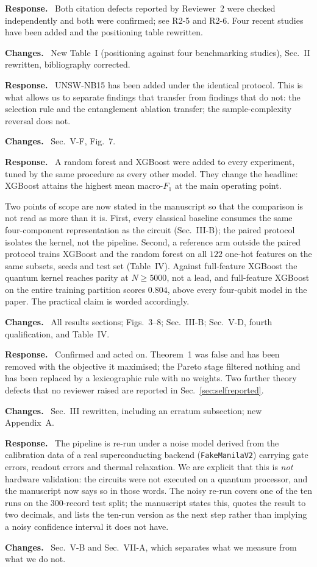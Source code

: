 \documentclass[11pt,a4paper]{article}
\newcommand{\itemhead}[2]{%
  \par\addvspace{15pt}%
  \noindent{\bfseries\color{tagink}#1}\hspace{0.7em}{\bfseries #2}%
  \par\addvspace{3.5pt}%
  \noindent{\color{rulegray}\rule{\linewidth}{0.5pt}}%
  \par\addvspace{5pt}%
  \nobreak}
\newcommand{\resp}{\par\addvspace{2pt}\noindent\textbf{Response.}\ }
\newcommand{\changed}{\par\addvspace{5pt}\noindent
  {\bfseries\color{tagink}Changes.}\ }
\begin{document}
\itemhead{AE-2}{Insufficient literature coverage, including non-existent
references}
\resp
Both citation defects reported by Reviewer~2 were checked independently and both
were confirmed; see R2-5 and R2-6. Four recent studies have been added and the
positioning table rewritten.
\changed
New Table~I (positioning against four benchmarking studies), Sec.~II rewritten,
bibliography corrected.

\itemhead{AE-3}{Reviewer~1 requests validation on an additional dataset}
\resp
UNSW-NB15 has been added under the identical protocol. This is what allows us to
separate findings that transfer from findings that do not: the selection rule
and the entanglement ablation transfer; the sample-complexity reversal does not.
\changed
Sec.~V-F, Fig.~7.

\itemhead{AE-4}{Comparison with non-SVM methods as a prerequisite for practical
advantage claims}
\resp
A random forest and XGBoost were added to every experiment, tuned by the same
procedure as every other model. They change the headline: XGBoost attains the
highest mean macro-$F_1$ at the main operating point.

Two points of scope are now stated in the manuscript so that the comparison is
not read as more than it is. First, every classical baseline consumes the same
four-component representation as the circuit (Sec.~III-B); the paired protocol
isolates the kernel, not the pipeline. Second, a reference arm outside the
paired protocol trains XGBoost and the random forest on all $122$ one-hot
features on the same subsets, seeds and test set (Table~IV). Against
full-feature XGBoost the quantum kernel reaches parity at $N\geq5000$, not a
lead, and full-feature XGBoost on the entire training partition scores $0.804$,
above every four-qubit model in the paper. The practical claim is worded
accordingly.
\changed
All results sections; Figs.~3--8; Sec.~III-B; Sec.~V-D, fourth qualification, and Table~IV.

\itemhead{AE-5}{Reviewer~4 identified issues in the theory}
\resp
Confirmed and acted on. Theorem~1 was false and has been removed with the
objective it maximised; the Pareto stage filtered nothing and has been replaced
by a lexicographic rule with no weights. Two further theory defects that no
reviewer raised are reported in Sec.~\ref{sec:selfreported}.
\changed
Sec.~III rewritten, including an erratum subsection; new Appendix~A.

\itemhead{AE-6}{``NISQ-ready'' not supported by experiments or noisy
simulations}
\resp
The pipeline is re-run under a noise model derived from the calibration data of
a real superconducting backend (\texttt{FakeManilaV2}) carrying gate errors,
readout errors and thermal relaxation. We are explicit that this is
\emph{not} hardware validation: the circuits were not executed on a quantum
processor, and the manuscript now says so in those words. The noisy re-run
covers one of the ten runs on the $300$-record test split; the manuscript
states this, quotes the result to two decimals, and lists the ten-run version
as the next step rather than implying a noisy confidence interval it does not
have.
\changed
Sec.~V-B and Sec.~VII-A, which separates what we measure from what we do not.
\end{document}
